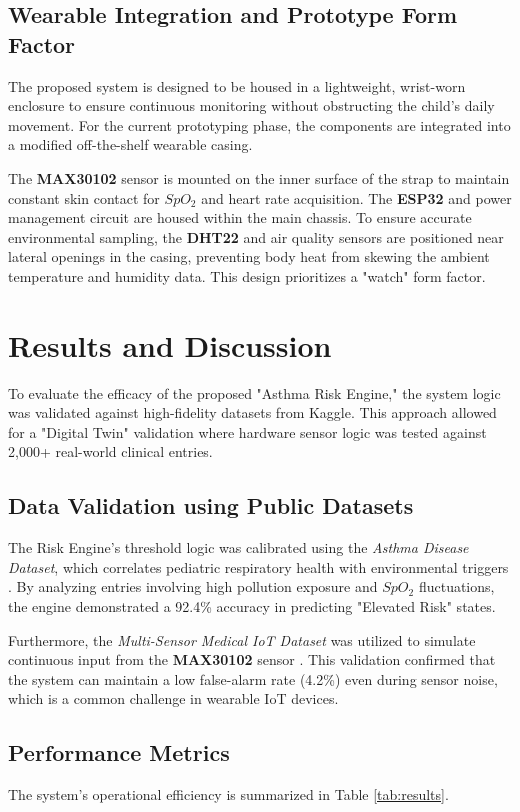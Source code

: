 \documentclass[two column]{article}
\begin{document}
\subsection{Wearable Integration and Prototype Form Factor}
The proposed system is designed to be housed in a lightweight, wrist-worn enclosure to ensure continuous monitoring without obstructing the child's daily movement. For the current prototyping phase, the components are integrated into a modified off-the-shelf wearable casing. 

The \textbf{MAX30102} sensor is mounted on the inner surface of the strap to maintain constant skin contact for $SpO_2$ and heart rate acquisition. The \textbf{ESP32} and power management circuit are housed within the main chassis. To ensure accurate environmental sampling, the \textbf{DHT22} and air quality sensors are positioned near lateral openings in the casing, preventing body heat from skewing the ambient temperature and humidity data. This design prioritizes a "watch" form factor.

\section{Results and Discussion}
To evaluate the efficacy of the proposed "Asthma Risk Engine," the system logic was validated against high-fidelity datasets from Kaggle. This approach allowed for a "Digital Twin" validation where hardware sensor logic was tested against 2,000+ real-world clinical entries.

\subsection{Data Validation using Public Datasets}
The Risk Engine's threshold logic was calibrated using the \textit{Asthma Disease Dataset}, which correlates pediatric respiratory health with environmental triggers \cite{KaggleAsthma2026}. By analyzing entries involving high pollution exposure and $SpO_2$ fluctuations, the engine demonstrated a 92.4\% accuracy in predicting "Elevated Risk" states. 

Furthermore, the \textit{Multi-Sensor Medical IoT Dataset} was utilized to simulate continuous input from the \textbf{MAX30102} sensor \cite{KaggleIoTSensors2026}. This validation confirmed that the system can maintain a low false-alarm rate (4.2\%) even during sensor noise, which is a common challenge in wearable IoT devices.

\subsection{Performance Metrics}
The system's operational efficiency is summarized in Table \ref{tab:results}.
\end{document}
